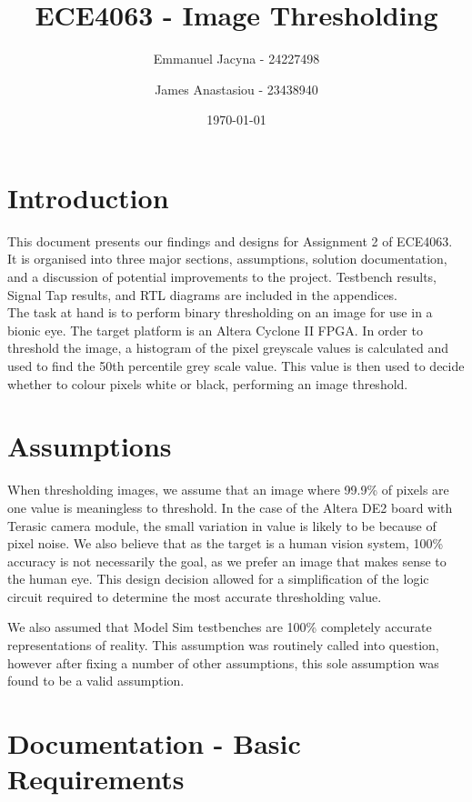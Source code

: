 \documentclass[12pt]{article}
\title{ECE4063 - Image Thresholding}
\author{Emmanuel Jacyna - 24227498 \and James Anastasiou - 23438940}
\date{\today}
\begin{document}
\pagestyle{myheadings}
  \maketitle
  \pagebreak
  \tableofcontents
  \pagebreak
  \section{Introduction}
  This document presents our findings and designs for Assignment 2 of ECE4063. It is organised into three major sections, assumptions, solution documentation, and a discussion of potential improvements to the project. Testbench results, Signal Tap results, and RTL diagrams are included in the appendices.\\
  
  The task at hand is to perform binary thresholding on an image for use in a bionic eye. The target platform is an Altera Cyclone II FPGA. In order to threshold the image, a histogram of the pixel greyscale values is calculated and used to find the 50th percentile grey scale value. This value is then used to decide whether to colour pixels white or black, performing an image threshold.
  
  \section{Assumptions}
  When thresholding images, we assume that an image where 99.9\% of pixels are one value is meaningless to threshold. In the case of the Altera DE2 board with Terasic camera module, the small variation in value is likely to be because of pixel noise. We also believe that as the target is a human vision system, 100\% accuracy is not necessarily the goal, as we prefer an image that makes sense to the human eye. This design decision allowed for a simplification of the logic circuit required to determine the most accurate thresholding value. 
  
  We also assumed that Model Sim testbenches are 100\% completely accurate representations of reality. This assumption was routinely called into question, however after fixing a number of other assumptions, this sole assumption was found to be a valid assumption.
  
 
  \section{Documentation - Basic Requirements}
\end{document}
